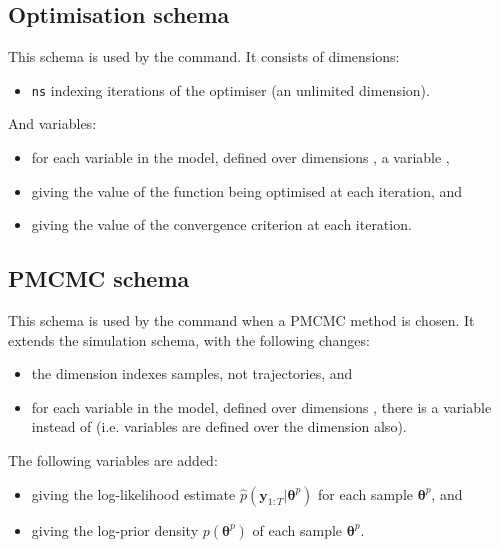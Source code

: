 \subsection{Optimisation schema}

This schema is used by the  command. It consists of
dimensions:
\begin{itemize}
\item \texttt{ns} indexing iterations of the optimiser (an unlimited
  dimension).
\end{itemize}
And variables:
\begin{itemize}
\item for each  variable  in the model,
  defined over dimensions , a variable
  ,
\item {} giving the value of the function being
  optimised at each iteration, and
\item {} giving the value of the convergence criterion
  at each iteration.
\end{itemize}

\subsection{PMCMC schema}

This schema is used by the  command when a PMCMC method is
chosen. It extends the simulation schema, with the following changes:
\begin{itemize}
\item the  dimension indexes samples, not trajectories, and
\item for each  variable  in the model,
  defined over dimensions , there is a variable
   instead of
   (i.e.  variables are
  defined over the  dimension also).
\end{itemize}
The following variables are added:
\begin{itemize}
\item {} giving the log-likelihood estimate
  $\hat{p}(\mathbf{y}_{1:T}|\boldsymbol{\theta}^p)$ for each sample
  $\boldsymbol{\theta}^p$, and
\item {} giving the log-prior density
  $p(\boldsymbol{\theta}^p)$ of each sample $\boldsymbol{\theta}^p$.
\end{itemize}

